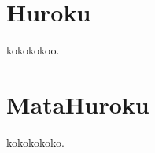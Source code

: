 \documentclass[12pt,epsf,dvipdfmx]{report}
\begin{document}
\renewcommand{\thesection}{\Alph{section}}
\appendix
{}
\chapter{Huroku}

kokokokoo.

\chapter{MataHuroku}

kokokokoko.

\end{document}
